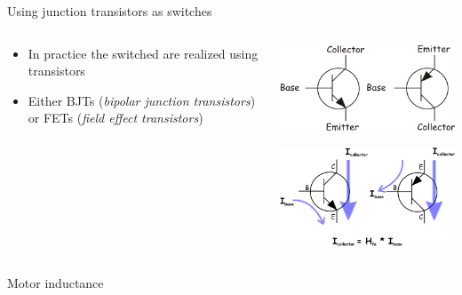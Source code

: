 \documentclass[compress]{beamer}
\begin{document}
\begin{frame}{Using junction transistors as switches}

    \begin{columns}
        \begin{column}{0.5\linewidth}
            \begin{itemize}
                \item In practice the switched are realized using transistors

                \item Either BJTs (\emph{bipolar junction transistors}) or
                    FETs (\emph{field effect transistors})
            \end{itemize}

        \end{column}
        \begin{column}{0.5\linewidth}
            \begin{center}
                \includegraphics[width=0.8\linewidth]{pnp-npn}

                \includegraphics[width=0.8\linewidth]{pnp-npn2}
            \end{center}
        \end{column}
    \end{columns}
\end{frame}


{
    \begin{frame}{Motor inductance}
    \end{frame}
}
\end{document}
